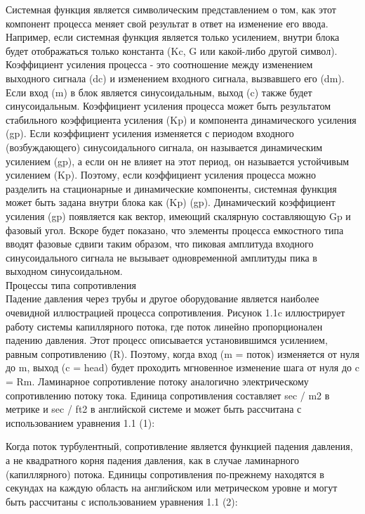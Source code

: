 \documentclass[aps,
12pt,
final,
oneside,
onecolumn,
musixtex, 
superscriptaddress,
centertags]{article}
\begin{document}
Системная функция является символическим представлением о том, как этот компонент процесса меняет свой результат в ответ на изменение его ввода. Например, если системная функция является только усилением, внутри блока будет отображаться только константа (Kc, G или какой-либо другой символ). Коэффициент усиления процесса - это соотношение между изменением выходного сигнала (dc) и изменением входного сигнала, вызвавшего его (dm). Если вход (m) в блок является синусоидальным, выход (c) также будет синусоидальным. Коэффициент усиления процесса может быть результатом стабильного коэффициента усиления (Kp) и компонента динамического усиления (gp). Если коэффициент усиления изменяется с периодом входного (возбуждающего) синусоидального сигнала, он называется динамическим усилением (gp), а если он не влияет на этот период, он называется устойчивым усилением (Kp). Поэтому, если коэффициент усиления процесса можно разделить на стационарные и динамические компоненты, системная функция может быть задана внутри блока как (Kp) (gp). Динамический коэффициент усиления (gp) появляется как вектор, имеющий скалярную составляющую Gp и фазовый угол. Вскоре будет показано, что элементы процесса емкостного типа вводят фазовые сдвиги таким образом, что пиковая амплитуда входного синусоидального сигнала не вызывает одновременной амплитуды пика в выходном синусоидальном.\\

Процессы типа сопротивления \\

Падение давления через трубы и другое оборудование является наиболее очевидной иллюстрацией процесса сопротивления. Рисунок 1.1c иллюстрирует работу системы капиллярного потока, где поток линейно пропорционален падению давления. Этот процесс описывается установившимся усилением, равным сопротивлению (R). Поэтому, когда вход (m = поток) изменяется от нуля до m, выход (c = head) будет проходить мгновенное изменение шага от нуля до c = Rm. Ламинарное сопротивление потоку аналогично электрическому сопротивлению потоку тока. Единица сопротивления составляет sec / m2 в метрике и sec / ft2 в английской системе и может быть рассчитана с использованием уравнения 1.1 (1):

Когда поток турбулентный, сопротивление является функцией падения давления, а не квадратного корня падения давления, как в случае ламинарного (капиллярного) потока. Единицы сопротивления по-прежнему находятся в секундах на каждую область на английском или метрическом уровне и могут быть рассчитаны с использованием уравнения 1.1 (2):
\end{document}
